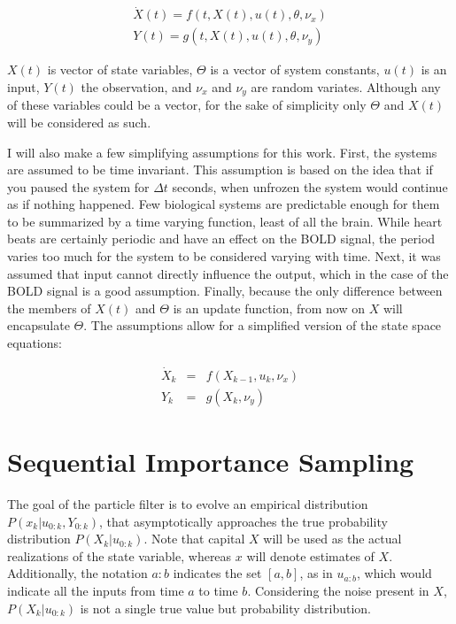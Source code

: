 \begin{eqnarray}
\dot{X}(t) = f(t, X(t), u(t), \theta, \nu_x) \nonumber \\
Y(t) = g(t, X(t), u(t), \theta, \nu_y)
\label{eq:GenericNonlinear}
\end{eqnarray}

$X(t)$ is vector of state variables, $\Theta$ is a vector of system
constants, $u(t)$ is an input, $Y(t)$ the observation, and
$\nu_x$ and $\nu_y$ are random variates. Although any of these
variables could be a vector, for the sake of simplicity only
$\Theta$ and $X(t)$ will be considered as such. 

I will also make a few  simplifying assumptions for this work. 
First, the systems are assumed to be 
time invariant. This 
assumption is based on the idea that if you paused the system for $\Delta t$
seconds, when unfrozen the system would continue as if nothing happened. 
Few biological systems are predictable enough for them to be summarized
by a time varying function, least of all the brain. While heart beats are certainly
periodic and have an effect on the BOLD signal, the period varies too much
for the system to be considered varying with time. 
Next, it was assumed that input cannot directly
influence the output, which in the case of the BOLD signal is a good assumption.
Finally, because the only difference between the members of $X(t)$ and 
$\Theta$ is an update function, from now on $X$ will encapsulate
$\Theta$. The assumptions allow for a simplified version of the
state space equations:

\begin{eqnarray}
\dot{X}_k &=& f(X_{k-1}, u_k, \nu_x)
\label{eq:stateass}\\
Y_k &= &g(X_k, \nu_y)
\label{eq:measass}
\end{eqnarray}

\section{Sequential Importance Sampling}
The goal of the particle filter is to evolve an empirical distribution 
$P(x_k | u_{0:k}, Y_{0:k})$,
that asymptotically approaches the true probability distribution $P(X_k | u_{0:k})$.
Note that capital $X$ will be used as the actual realizations of 
the state variable, whereas $x$ will denote estimates of $X$.
Additionally, the notation $a:b$ indicates the set $[a,b]$,
as in $u_{a:b}$, which would indicate all the inputs from time $a$ to time $b$.
Considering the noise present in $X$,
 $P(X_k | u_{0:k})$ is not a single true value but probability distribution. 

